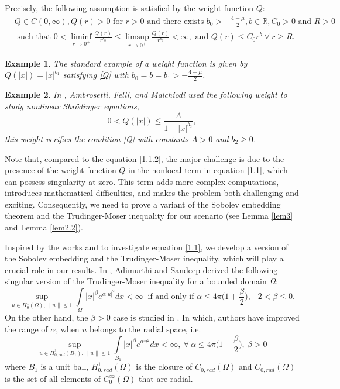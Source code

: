 \documentclass[11pt]{amsart}
\numberwithin{equation}{section}
\newtheorem{ex}{Example}
\newcommand{\R}{\mathbb{R}}
\newcommand{\h}{H^1_0(\Omega)}
\newcommand{\hr}{H^1_{0, rad}(\Omega)}
\newcommand{\1}{\frac{1}{2}}
\begin{document}
	Precisely, the following assumption is satisfied by the weight function $Q$:
	\begin{align}
		\tag{Q} \label{Q}
		&Q\in C(0, \infty), Q(r) >0 \text{ for } r>0
		\text{ and there exists } b_0 > -\frac{4-\mu}{2}, b\in \R, C_0>0 \text{ and } R>0\\
		&\text{ such that } 0< \liminf_{r\to 0^+} \frac{Q(r)}{r^{b_0}}\leq \limsup_{r \rightarrow 0^+} \frac{Q(r)}{r^{b_0}} < \infty, \text{ and } Q(r) \leq C_0 r^b \ \forall \ r \geq R.\nonumber
	\end{align}
	
	\begin{ex}
		The standard example of a weight function is given by $Q(|x|) = |x|^{b_1}$ satisfying \eqref{Q} with $b_0= b= b_1 > -\frac{4-\mu}{2}$.
	\end{ex}
	\begin{ex}
		In \cite{Felli}, Ambrosetti, Felli, and Malchiodi used the following weight to study nonlinear Shr\"{o}dinger equations,
		\[0< Q(|x|) \leq \frac{A}{1+|x|^{b_2}},\] 
		this weight verifies the condition \eqref{Q} with constants $A>0$ and $b_2 \geq 0$.
	\end{ex}
	
	Note that, compared to the equation \eqref{1.1.2}, the major challenge is due to the presence of the weight function $Q$ in the nonlocal term in equation \eqref{1.1}, which can possess singularity at zero. This term adds more complex computations, introduces mathematical difficulties, and makes the problem both challenging and exciting. Consequently, we need to prove a variant of the Sobolev embedding theorem and the Trudinger-Moser inequality for our scenario (see Lemma \ref{lem3} and Lemma \ref{lem2.2}).
	
	Inspired by the works \cite{Bonheure,Calanchi,Figueiredo1,Figueiredo2, Sandeep} and to investigate equation \eqref{1.1}, we develop a version of the Sobolev embedding and the Trudinger-Moser inequality, which will play a crucial role in our results. In \cite{Sandeep}, Adimurthi and Sandeep derived the following singular version of the Trudinger-Moser inequality for a bounded domain $\Omega$:
	\begin{equation}
		\label{2.5}
		\sup_{ u \in \h, \|u\|\leq 1} \int\limits_\Omega |x|^\beta e^{\alpha |u|^2}dx < \infty \ \text{ if and only if } \alpha \leq 4\pi\Big(1+\frac{\beta}{2}\Big), -2< \beta \leq 0.
	\end{equation}
	On the other hand, the $\beta >0$ case is studied in \cite{Bonheure,Calanchi,Figueiredo1,Figueiredo2}. In which, authors have improved the range of $\alpha$, when $u$ belongs to the radial space, i.e. 
	\begin{equation} 
		\label{2.6}
		\sup_{u\in H^1_{0,rad}(B_1), \|u\|\leq 1} \int\limits_{B_1} |x|^{\beta}  e^{\alpha u^2} dx < \infty, \ \forall \ \alpha \leq 4\pi\Big(1+\frac{\beta}{2}\Big),\ \beta> 0
	\end{equation}
	where $B_1$ is a unit ball, $\hr$ is the closure of $C_{0, rad}(\Omega)$ and $C_{0,rad}(\Omega)$ is the set of all elements of $C_{0}^\infty(\Omega)$ that are radial.
	
\end{document}
